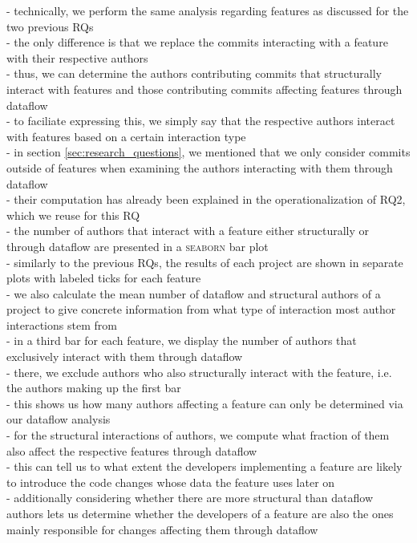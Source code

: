 - technically, we perform the same analysis regarding features as discussed for the two previous RQs \\
- the only difference is that we replace the commits interacting with a feature with their respective authors \\
- thus, we can determine the authors contributing commits that structurally interact with features and those contributing commits affecting features through dataflow \\
- to faciliate expressing this, we simply say that the respective authors interact with features based on a certain interaction type \\
- in section \ref{sec:research_questions}, we mentioned that we only consider commits outside of features when examining the authors interacting with them through dataflow \\
- their computation has already been explained in the operationalization of RQ2, which we reuse for this RQ \\
- the number of authors that interact with a feature either structurally or through dataflow are presented in a \textsc{seaborn} bar plot \\
- similarly to the previous RQs, the results of each project are shown in separate plots with labeled ticks for each feature \\
- we also calculate the mean number of dataflow and structural authors of a project to give concrete information from what type of interaction most author interactions stem from \\
- in a third bar for each feature, we display the number of authors that exclusively interact with them through dataflow \\
- there, we exclude authors who also structurally interact with the feature, i.e. the authors making up the first bar \\
- this shows us how many authors affecting a feature can only be determined via our dataflow analysis \\
- for the structural interactions of authors, we compute what fraction of them also affect the respective features through dataflow \\
- this can tell us to what extent the developers implementing a feature are likely to introduce the code changes whose data the feature uses later on \\
- additionally considering whether there are more structural than dataflow authors lets us determine whether the developers of a feature are also the ones mainly responsible for changes affecting them through dataflow \\






































